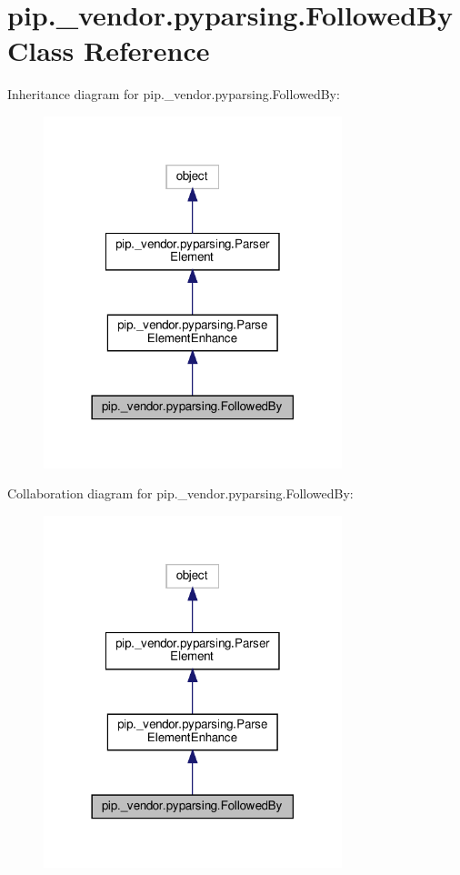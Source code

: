 \hypertarget{classpip_1_1__vendor_1_1pyparsing_1_1FollowedBy}{}\section{pip.\+\_\+vendor.\+pyparsing.\+Followed\+By Class Reference}
\label{classpip_1_1__vendor_1_1pyparsing_1_1FollowedBy}


Inheritance diagram for pip.\+\_\+vendor.\+pyparsing.\+Followed\+By\+:
\nopagebreak
\begin{figure}[H]
\begin{center}
\leavevmode
\includegraphics[width=246pt]{classpip_1_1__vendor_1_1pyparsing_1_1FollowedBy__inherit__graph}
\end{center}
\end{figure}


Collaboration diagram for pip.\+\_\+vendor.\+pyparsing.\+Followed\+By\+:
\nopagebreak
\begin{figure}[H]
\begin{center}
\leavevmode
\includegraphics[width=246pt]{classpip_1_1__vendor_1_1pyparsing_1_1FollowedBy__coll__graph}
\end{center}
\end{figure}

